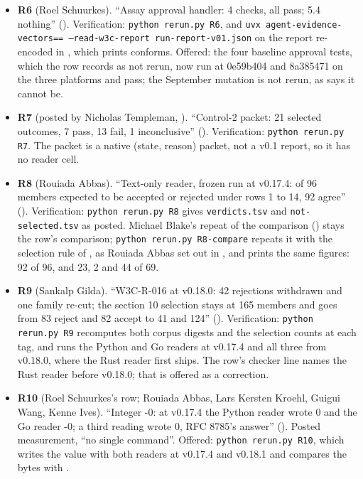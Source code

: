 \begin{flushleft}
\begin{itemize}
\item \textbf{R6} (Roel Schuurkes). ``Assay approval handler: 4 checks, all pass; 5.4 nothing'' (). Verification: \texttt{python rerun.py R6}, and \texttt{uvx agent-evidence-vectors==\aevreadrelease{} --read-w3c-report run-report-v01.json} on the report re-encoded in , which prints conforms. Offered: the four baseline approval tests, which the row records as not rerun, now run at 0e59b404 and 8a385471 on the three platforms and pass; the September mutation is not rerun, as  says it cannot be.
\item \textbf{R7} (posted by Nicholas Templeman, ). ``Control-2 packet: 21 selected outcomes, 7 pass, 13 fail, 1 inconclusive'' (). Verification: \texttt{python rerun.py R7}. The packet is a native (state, reason) packet, not a v0.1 report, so it has no reader cell.
\item \textbf{R8} (Rouiada Abbas). ``Text-only reader, frozen run at v0.17.4: of 96 members expected to be accepted or rejected under rows 1 to 14, 92 agree'' (). Verification: \texttt{python rerun.py R8} gives \texttt{verdicts.tsv} and \texttt{not-selected.tsv} as posted. Michael Blake's repeat of the comparison () stays the row's comparison; \texttt{python rerun.py R8-compare} repeats it with the selection rule of , as Rouiada Abbas set out in , and prints the same figures: 92 of 96, and 23, 2 and 44 of 69.
\item \textbf{R9} (Sankalp Gilda). ``W3C-R-016 at v0.18.0: 42 rejections withdrawn and one family re-cut; the section 10 selection stays at 165 members and goes from 83 reject and 82 accept to 41 and 124'' (). Verification: \texttt{python rerun.py R9} recomputes both corpus digests and the selection counts at each tag, and runs the Python and Go readers at v0.17.4 and all three from v0.18.0, where the Rust reader first ships. The row's checker line names the Rust reader before v0.18.0; that is offered as a correction.
\item \textbf{R10} (Roel Schuurkes's row; Rouiada Abbas, Lars Kersten Kroehl, Guigui Wang, Kenne Ives). ``Integer -0: at v0.17.4 the Python reader wrote 0 and the Go reader -0; a third reading wrote 0, RFC 8785's answer'' (). Posted measurement, ``no single command''. Offered: \texttt{python rerun.py R10}, which writes the value with both readers at v0.17.4 and v0.18.1 and compares the bytes with .

\end{itemize}
\end{flushleft}
